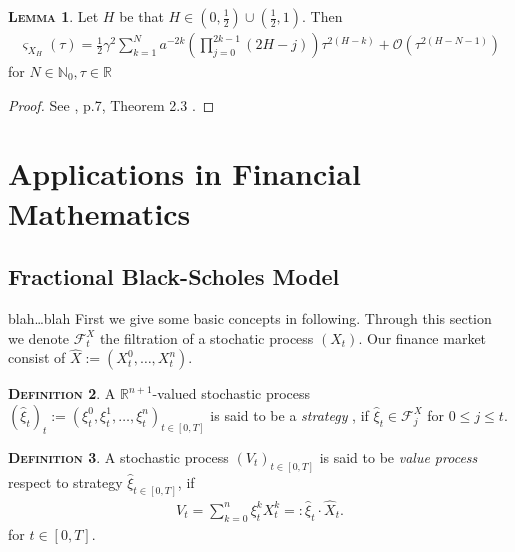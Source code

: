 \documentclass[a4paper, twoside, 11pt]{article}
\theoremstyle{definition}
\newtheorem{definition}{\scshape Definition}[section]
\newtheorem{lemma}[definition]{\scshape Lemma}
\newcommand{\brkt}[1]{\left({#1} \right)}
\begin{document}
\begin{lemma}
  Let $H$ be that $H\in (0, \frac{1}{2}) \cup (\frac{1}{2}, 1)$. Then
  \begin{eqnarray*}
	\varsigma_{X_{H}}(\tau) = \frac{1}{2} \gamma^2 \sum_{k=1}^{N} a^{-2k}\brkt{\prod_{j=0}^{2k-1}(2H-j)}\tau^{2(H-k)} + \mathcal{O}(\tau^{2(H-N-1)})
\end{eqnarray*}
for $N \in \mathbb{N}_{0}, \tau\in\mathbb{R}$
  \label{sec:autocor}
\end{lemma}
\begin{proof}
  See \cite{chriel}, p.7, Theorem 2.3 .
\end{proof}
\newpage

\section{Applications in Financial Mathematics}
\setcounter{equation}{0}
\subsection{Fractional Black-Scholes Model}
blah\dots blah
First we give some basic concepts in following. Through this section we denote $\mathcal{F}^X_t$ the filtration of a stochatic process $(X_t)$. Our finance market consist of $\hat{X}:=(X_t^0,\dots, X_t^n)$.

\begin{definition}
  A $\mathbb{R}^{n+1}$-valued stochastic process $(\hat{\xi}_t)_t:=(\xi_t^0, \xi_t^1,\dots, \xi_t^n)_{t\in [0, T]}$ is said to be a \emph{strategy} , if $\hat{\xi}_t \in \mathcal{F}^X_{j}$ for $0\le j \le t$.
\end{definition}

\begin{definition}
  A stochastic process $(V_t)_{t\in[0, T]}$ is said to be \emph{value process} respect to strategy $\hat{\xi}_{t\in [0, T]}$, if 
  \begin{eqnarray*}
	V_t = \sum_{k=0}^n \xi^k_t X^k_t =: \hat{\xi}_t\cdot\hat{X}_t.
  \end{eqnarray*}
  for $t \in [0, T]$.
\end{definition}

\end{document}
